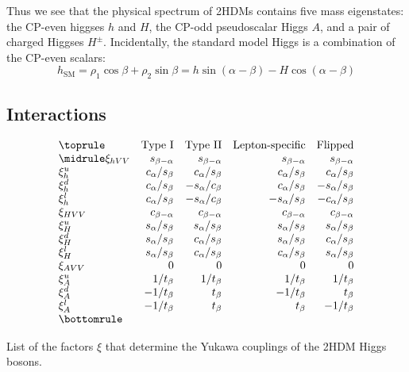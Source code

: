 Thus we see that the physical spectrum of 2HDMs contains five mass eigenstates: the CP-even higgses $h$ and $H$, the CP-odd pseudoscalar Higgs $A$, and a pair of charged Higgses $H^\pm$. Incidentally, the standard model Higgs is a combination of the CP-even scalars:
\begin{equation}
h_\text{SM} = \rho_1\cos\beta + \rho_2\sin\beta = h\sin(\alpha-\beta)-H\cos(\alpha-\beta)
\label{eq:h_SM}
\end{equation}


\subsection{Interactions}

\newcommand{\sbma}{s_{\beta-\alpha}}
\newcommand{\cbma}{c_{\beta-\alpha}}
\newcommand{\casb}{c_\alpha/s_\beta}
\newcommand{\sacb}{s_\alpha/c_\beta}
\newcommand{\sasb}{s_\alpha/s_\beta}
\begin{table}
  \[
    \begin{array}{lrrrr}
      \toprule
         & \text{Type I} & \text{Type II} & \text{Lepton-specific} & \text{Flipped}\\
         \midrule
      \xi_{hVV} & \sbma & \sbma & \sbma & \sbma \\
      \xi_{h}^u & \casb & \casb & \casb & \casb \\
      \xi_{h}^d & \casb & -\sacb & \casb & -\sasb \\
      \xi_{h}^l & \casb & -\sacb & -\sasb & -\casb \\
      \xi_{HVV} & \cbma & \cbma  & \cbma & \cbma \\
      \xi_{H}^u & \sasb & \sasb & \sasb & \sasb \\
      \xi_{H}^d & \sasb & \casb & \sasb & \casb \\
      \xi_{H}^l & \sasb & \casb & \casb & \sasb \\
      \xi_{AVV} & 0     & 0     & 0     & 0 \\
      \xi_{A}^u & 1/t_\beta & 1/t_\beta & 1/t_\beta & 1/t_\beta \\
      \xi_{A}^d & -1/t_\beta & t_\beta & -1/t_\beta & t_\beta \\
      \xi_{A}^l & -1/t_\beta & t_\beta & t_\beta & -1/t_\beta \\
      \bottomrule
\end{array}\]
\caption{List of the factors $\xi$ that determine the Yukawa couplings of the 2HDM Higgs bosons.}
\label{tab:xi_factors}
\end{table}


